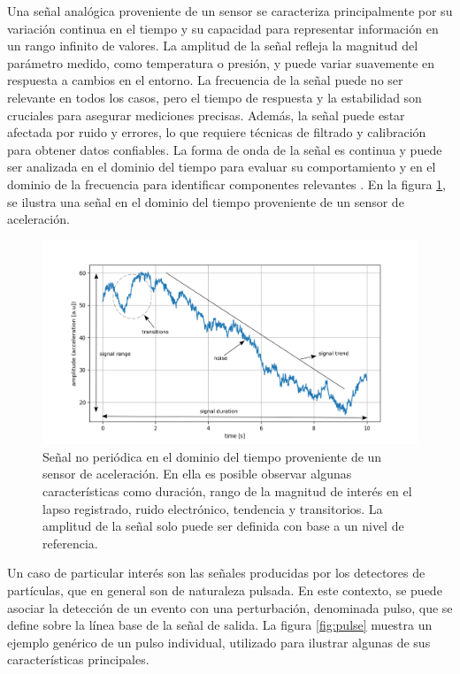 \documentclass[]{book}
\begin{document}
\noindent Una señal analógica proveniente de un sensor se caracteriza principalmente por su variación continua en el tiempo y su capacidad para representar información en un rango infinito de valores. La amplitud de la señal refleja la magnitud del parámetro medido, como temperatura o presión, y puede variar suavemente en respuesta a cambios en el entorno. La frecuencia de la señal puede no ser relevante en todos los casos, pero el tiempo de respuesta y la estabilidad son cruciales para asegurar mediciones precisas. Además, la señal puede estar afectada por ruido y errores, lo que requiere técnicas de filtrado y calibración para obtener datos confiables. La forma de onda de la señal es continua y puede ser analizada en el dominio del tiempo para evaluar su comportamiento y en el dominio de la frecuencia para identificar componentes relevantes \cite{sinclair2000sensors}. En la figura \ref{fig:generic_signal}, se ilustra una señal en el dominio del tiempo proveniente de un sensor de aceleración.\\

\begin{figure}[h]
    \centering
    \includegraphics[width=1.0\textwidth]{mysignal.png}
    \caption{Señal no periódica en el dominio del tiempo proveniente de un sensor de aceleración. En ella es posible observar algunas características como duración, rango de la magnitud de interés en el lapso registrado, ruido electrónico, tendencia y transitorios. La amplitud de la señal solo puede ser definida con base a un nivel de referencia.}
    \label{fig:generic_signal}

\end{figure}

\noindent Un caso de particular interés son las señales producidas por los detectores de partículas, que en general son de naturaleza pulsada. En este contexto, se puede asociar la detección de un evento con una perturbación, denominada pulso, que se define sobre la línea base de la señal de salida. La figura \ref{fig:pulse} muestra un ejemplo genérico de un pulso individual, utilizado para ilustrar algunas de sus características principales.
\end{document}
